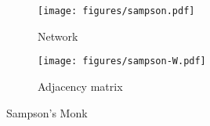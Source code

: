 \begin{figure}[t]
	\centering
	\begin{subfigure}{0.31\textwidth}
		\centering
		\texttt{[image: figures/sampson.pdf]}
		\caption{Network}
	\end{subfigure}
	\begin{subfigure}{0.31\textwidth}
		\centering
		\texttt{[image: figures/sampson-W.pdf]}
		\caption{Adjacency matrix}
	\end{subfigure}
	\caption{Sampson's Monk}
	\label{fig:S}
\end{figure}
